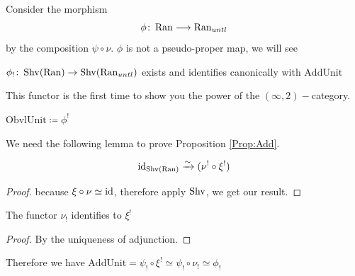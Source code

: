 \documentclass[oneside]{amsart}
\begin{document}
Consider the morphism 
\[
    \phi \colon \Ran \to \Ran_{untl}
\]
by the composition $\psi \circ \nu$. $\phi$ is not a pseudo-proper map, we will see

\begin{proposition}\label{Prop:Add}\cite[Proposition~4.4.2]{abott}
    $\phi_! \colon \Shv(\Ran) \to\Shv (\Ran_{untl})$
    exists and identifies canonically with $\mathrm{AddUnit}$
\end{proposition}

\begin{remark}
    This functor is the first time to show you the power of the $(\infty,2)-$category.
\end{remark}

\begin{definition}
     $\mathrm{ObvlUnit}\coloneqq \phi^!$
\end{definition}

We need the following lemma to prove Proposition \ref{Prop:Add}.
\begin{lemma}
    \[
    \operatorname{id}_{\operatorname{Shv}(\operatorname{Ran})} \xrightarrow[]{\sim} (\nu^! \circ \xi^!)
    \]
\end{lemma}
\begin{proof}
    because $\xi \circ \nu \simeq \operatorname{id}$, therefore apply $\operatorname{Shv}$, we get our result.
\end{proof}

\begin{corollary}
    The functor $\nu_!$ identifies to $\xi^!$
\end{corollary}

\begin{proof}
    By the uniqueness of adjunction.
\end{proof}

Therefore we have $\mathrm{AddUnit} = \psi_!\circ \xi^! \simeq \psi_! \circ \nu_! \simeq \phi_!$


\appendix
\printbibliography
\end{document}
